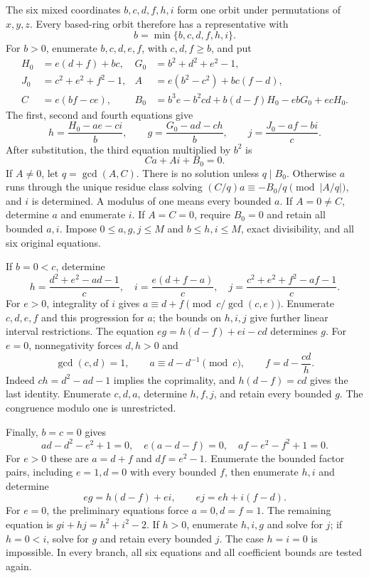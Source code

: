 \documentclass[11pt,a4paper]{article}
\theoremstyle{definition}\newtheorem{definition}[theorem]{Definition}\newtheorem{remark}[theorem]{Remark}
\begin{document}
The six mixed coordinates $b,c,d,f,h,i$ form one orbit under
permutations of $x,y,z$. Every based-ring orbit therefore has a
representative with
\[
 b=\min\{b,c,d,f,h,i\}.
\]
For $b>0$, enumerate $b,c,d,e,f$, with $c,d,f\geq b$, and put
\begin{align*}
 H_0&=e(d+f)+bc,&G_0&=b^2+d^2+e^2-1,\\
 J_0&=c^2+e^2+f^2-1,&
 A&=e(b^2-c^2)+bc(f-d),\\
 C&=e(bf-ce),&
 B_0&=b^3e-b^2cd+b(d-f)H_0-ebG_0+ecH_0.
\end{align*}
The first, second and fourth equations give
\[
 h=\frac{H_0-ae-ci}{b},\qquad
 g=\frac{G_0-ad-ch}{b},\qquad
 j=\frac{J_0-af-bi}{c}.
\]
After substitution, the third equation multiplied by $b^2$ is
\begin{equation}\label{eq:census-linear}
 Ca+Ai+B_0=0.
\end{equation}
If $A\ne0$, let $q=\gcd(A,C)$. There is no solution unless $q\mid B_0$.
Otherwise $a$ runs through the unique residue class solving
$(C/q)a\equiv-B_0/q\pmod{|A/q|}$, and $i$ is determined.
A modulus of one means every bounded $a$. If $A=0\ne C$, determine
$a$ and enumerate $i$. If $A=C=0$, require $B_0=0$ and retain all bounded
$a,i$. Impose $0\leq a,g,j\leq M$ and $b\leq h,i\leq M$,
exact divisibility, and all six original equations.

If $b=0<c$, determine
\[
 h=\frac{d^2+e^2-ad-1}{c},\quad
 i=\frac{e(d+f-a)}c,\quad
 j=\frac{c^2+e^2+f^2-af-1}c.
\]
For $e>0$, integrality of $i$ gives
$a\equiv d+f\pmod{c/\gcd(c,e)}$. Enumerate $c,d,e,f$ and this
progression for $a$; the bounds on $h,i,j$ give further linear interval
restrictions. The equation $eg=h(d-f)+ei-cd$ determines $g$.
For $e=0$, nonnegativity forces $d,h>0$ and
\[
 \gcd(c,d)=1,\qquad a\equiv d-d^{-1}\pmod c,\qquad
 f=d-\frac{cd}{h}.
\]
Indeed $ch=d^2-ad-1$ implies the coprimality, and $h(d-f)=cd$
gives the last identity. Enumerate $c,d,a$, determine $h,f,j$, and
retain every bounded $g$. The congruence modulo one is unrestricted.

Finally, $b=c=0$ gives
\[
 ad-d^2-e^2+1=0,\quad e(a-d-f)=0,\quad af-e^2-f^2+1=0.
\]
For $e>0$ these are $a=d+f$ and $df=e^2-1$. Enumerate the bounded
factor pairs, including $e=1,d=0$ with every bounded $f$, then enumerate
$h,i$ and determine
\[
 eg=h(d-f)+ei,\qquad ej=eh+i(f-d).
\]
For $e=0$, the preliminary equations force $a=0,d=f=1$. The remaining
equation is $gi+hj=h^2+i^2-2$. If $h>0$, enumerate $h,i,g$ and solve
for $j$; if $h=0<i$, solve for $g$ and retain every bounded $j$.
The case $h=i=0$ is impossible. In every branch, all six equations and
all coefficient bounds are tested again.
\end{document}
